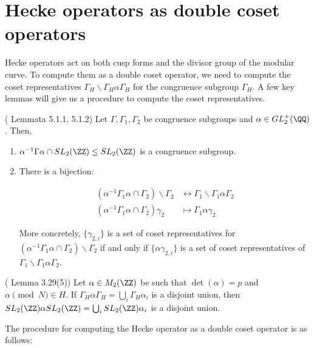 \section{Hecke operators as double coset operators}

Hecke operators act on both cusp forms and the divisor group of the modular curve. To compute them as a double coset operator, we need to compute the coset representatives $\Gamma_H \backslash \Gamma_H \alpha \Gamma_H$ for the congruence subgroup $\Gamma_H$. A few key lemmas will give us a procedure to compute the coset representatives.

\begin{lemma}{(\cite{Shurman} Lemmata 5.1.1, 5.1.2)}\label{lemma:coset_rep}
Let $\Gamma, \Gamma_1, \Gamma_2$ be congruence subgroups and  $\alpha \in GL_2^+(\QQ)$. Then,

\begin{enumerate}
    \item $\alpha^{-1} \Gamma \alpha \cap SL_2(\ZZ) \leq SL_2(\ZZ)$ is a congruence subgroup.
    \item There is a bijection:

    \begin{align*}
        (\alpha^{-1} \Gamma_1 \alpha \cap \Gamma_2 )\backslash \Gamma_2 &\leftrightarrow \Gamma_1 \backslash \Gamma_1 \alpha \Gamma_2 \\
         (\alpha^{-1} \Gamma_1 \alpha \cap \Gamma_2 )\gamma_2 &\mapsto \Gamma_1 \alpha \gamma_2
    \end{align*}

    More concretely, $\{\gamma_{2,i}\}$ is a set of coset representatives for $(\alpha^{-1} \Gamma_1 \alpha \cap \Gamma_2 )\backslash \Gamma_2$ if and only if $\{\alpha \gamma_{2,i}\}$ is a set of coset representatives of $\Gamma_1 \backslash \Gamma_1 \alpha \Gamma_2$.
\end{enumerate}
\end{lemma}

\begin{lemma}{(\cite{shimura} Lemma 3.29(5))} \label{lemma:shimura_coset}
Let $\alpha \in M_2(\ZZ)$ be such that $\det(\alpha) = p$ and $\alpha \pmod{N} \in H$. If $\Gamma_H \alpha \Gamma_H = \bigcup_i \Gamma_H \alpha_i$ is a disjoint union, then $SL_2(\ZZ) \alpha SL_2(\ZZ) = \bigcup_i SL_2(\ZZ)\alpha_i$ is a disjoint union.
\end{lemma}

The procedure for computing the Hecke operator as a double coset operator is as follows:

